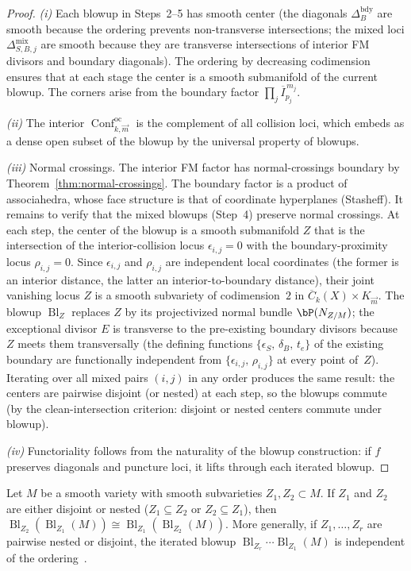 \begin{proof}
\emph{(i)} Each blowup in Steps~2--5 has smooth center
(the diagonals $\Delta_B^{\mathrm{bdy}}$ are smooth because the
ordering prevents non-transverse intersections; the mixed loci
$\Delta_{S,B,j}^{\mathrm{mix}}$ are smooth because they are
transverse intersections of interior FM divisors and boundary
diagonals). The ordering by decreasing codimension ensures that
at each stage the center is a smooth submanifold of the current
blowup. The corners arise from the boundary factor
$\prod_j \overline{I}_{p_j}^{\,m_j}$.

\emph{(ii)} The interior
$\operatorname{Conf}^{\mathrm{oc}}_{k,\vec{m}}$ is the complement
of all collision loci, which embeds as a dense open subset of the
blowup by the universal property of blowups.

\emph{(iii)} Normal crossings. The interior FM factor has
normal-crossings boundary by Theorem~\ref{thm:normal-crossings}.
The boundary factor is a product of associahedra, whose
face structure is that of coordinate hyperplanes (Stasheff).
It remains to verify that the mixed blowups (Step~4) preserve
normal crossings. At each step, the center of the blowup is a
smooth submanifold $Z$ that is the intersection of the
interior-collision locus $\epsilon_{i,j} = 0$ with the
boundary-proximity locus $\rho_{i,j} = 0$. Since $\epsilon_{i,j}$
and $\rho_{i,j}$ are independent local coordinates (the former is
an interior distance, the latter an interior-to-boundary distance),
their joint vanishing locus $Z$ is a smooth subvariety of
codimension~$2$ in $\overline{C}_k(X) \times K_{\vec{m}}$.
The blowup $\operatorname{Bl}_Z$ replaces $Z$ by its projectivized
normal bundle $\bP(N_{Z/M})$; the exceptional divisor $E$ is
transverse to the pre-existing boundary divisors because $Z$
meets them transversally (the defining functions
$\{\epsilon_S,\, \delta_B,\, t_e\}$ of the existing boundary are
functionally independent from $\{\epsilon_{i,j},\, \rho_{i,j}\}$
at every point of~$Z$). Iterating over all mixed pairs $(i,j)$
in any order produces the same result: the centers are pairwise
disjoint (or nested) at each step, so the blowups commute
(by the clean-intersection criterion: disjoint or nested centers
commute under blowup).

\emph{(iv)} Functoriality follows from the naturality of the
blowup construction: if $f$ preserves diagonals and puncture
loci, it lifts through each iterated blowup.
\end{proof}

\begin{lemma}
\label{lem:nested-blowup-commutativity}
Let $M$ be a smooth variety with smooth subvarieties
$Z_1, Z_2 \subset M$. If $Z_1$ and $Z_2$ are either
disjoint or nested \textup{(}$Z_1 \subseteq Z_2$ or
$Z_2 \subseteq Z_1$\textup{)}, then
$\operatorname{Bl}_{Z_2}(\operatorname{Bl}_{Z_1}(M))
\cong
\operatorname{Bl}_{Z_1}(\operatorname{Bl}_{Z_2}(M))$.
More generally, if $Z_1, \ldots, Z_r$ are pairwise nested
or disjoint, the iterated blowup
$\operatorname{Bl}_{Z_r} \cdots \operatorname{Bl}_{Z_1}(M)$
is independent of the ordering~\cite{FM94}.
\end{lemma}


